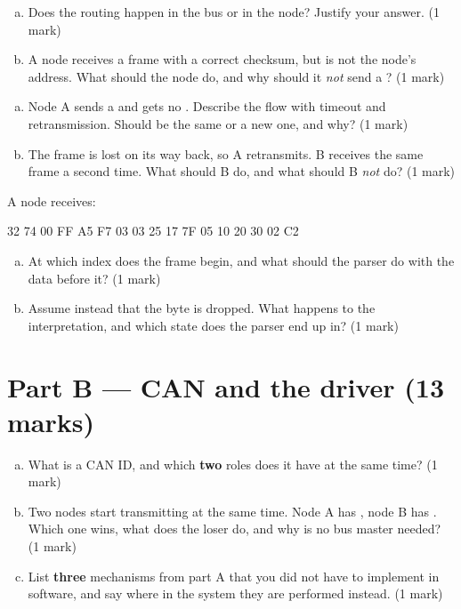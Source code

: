 \label{ex:d:3}
\begin{enumerate}[a)]
  \item Does the routing happen in the bus or in the node? Justify your answer. (1 mark)
  \item A node receives a frame with a correct checksum, but  is not the node's address.
    What should the node do, and why should it \emph{not} send a ? (1 mark)
\end{enumerate}

\label{ex:d:4}
\begin{enumerate}[a)]
  \item Node A sends a  and gets no . Describe the flow with timeout
    and retransmission. Should  be the same or a new one, and why? (1 mark)
  \item The  frame is lost on its way back, so A retransmits. B receives the same frame
    a second time. What should B do, and what should B \emph{not} do? (1 mark)
\end{enumerate}

\label{ex:d:5}
A node receives:
\begin{console}
32 74 00 FF A5 F7 03 03 25 17 7F 05 10 20 30 02 C2
\end{console}
\begin{enumerate}[a)]
  \item At which index does the frame begin, and what should the parser do with the data before
    it? (1 mark)
  \item Assume instead that the byte  is dropped. What happens to the interpretation,
    and which state does the parser end up in? (1 mark)
\end{enumerate}

\section*{Part B --- CAN and the driver (13 marks)}

\label{ex:d:6}
\begin{enumerate}[a)]
  \item What is a CAN ID, and which \textbf{two} roles does it have at the same time? (1 mark)
  \item Two nodes start transmitting at the same time. Node A has , node B has
    . Which one wins, what does the loser do, and why is no bus master needed?
    (1 mark)
  \item List \textbf{three} mechanisms from part A that you did not have to implement in software,
    and say where in the system they are performed instead. (1 mark)
\end{enumerate}

